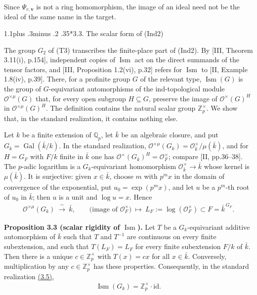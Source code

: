 \documentclass[11pt,a4paper]{amsart}
\makeatletter
\renewcommand\subsection{\@startsection{subsection}{2}{\z@}
{1.1\baselineskip plus .3\baselineskip minus .2\baselineskip}
{.35\baselineskip}{\normalfont\bfseries}}
\makeatother
\begin{document}
Since $\Psi_{r,\mathbf v}$ is not a ring homomorphism, the image of an ideal need not be the ideal of the same name in the target.


\Needspace{120pt}\subsection*{3.3. The scalar form of (Ind2)}

The group $G_2$ of (T3) transcribes the finite-place part of (Ind2). By [III, Theorem 3.11(i), p.154], independent copies of $\operatorname{Ism}$ act on the direct summands of the tensor factors, and [III, Proposition 1.2(vi), p.32] refers for $\operatorname{Ism}$ to [II, Example 1.8(iv), p.39]. There, for a profinite group $G$ of the relevant type, $\operatorname{Ism}(G)$ is the group of $G$-equivariant automorphisms of the ind-topological module $\mathcal O^{\times\mu}(G)$ that, for every open subgroup $H\subseteq G$, preserve the image of $\mathcal O^{\times}(G)^H$ in $\mathcal O^{\times\mu}(G)^H$. The definition contains the natural scalar group $\mathbb Z_p^\times$. We show that, in the standard realization, it contains nothing else.

Let $k$ be a finite extension of $\mathbb Q_p$, let $\bar k$ be an algebraic closure, and put $G_k=\operatorname{Gal}(\bar k/k)$. In the standard realization, $\mathcal O^{\times\mu}(G_k)=\mathcal O_{\bar k}^{\times}/\mu(\bar k)$, and for $H=G_F$ with $F/k$ finite in $\bar k$ one has $\mathcal O^\times(G_k)^H=\mathcal O_F^\times$; compare [II, pp.36--38]. The $p$-adic logarithm is a $G_k$-equivariant homomorphism $\mathcal O_{\bar k}^\times\to\bar k$ whose kernel is $\mu(\bar k)$. It is surjective: given $x\in\bar k$, choose $m$ with $p^mx$ in the domain of convergence of the exponential, put $u_0=\exp(p^mx)$, and let $u$ be a $p^m$-th root of $u_0$ in $\bar k$; then $u$ is a unit and $\log u=x$. Hence
\begin{equation}
\begin{gathered}
\mathcal O^{\times\mu}(G_k)\ \xrightarrow{\ \sim\ }\ \bar k,\qquad
\bigl(\text{image of }\mathcal O_F^\times\bigr)\ \longmapsto\ L_F:=\log(\mathcal O_F^\times)\subset F=\bar k^{\,G_F}.
\end{gathered}
\tag{3.5}\label{eq:3.5}
\end{equation}

\par\smallskip\noindent\textbf{Proposition 3.3 (scalar rigidity of $\operatorname{Ism}$).} Let $T$ be a $G_k$-equivariant additive automorphism of $\bar k$ such that $T$ and $T^{-1}$ are continuous on every finite subextension, and such that $T(L_F)=L_F$ for every finite subextension $F/k$ of $\bar k$. Then there is a unique $c\in\mathbb Z_p^\times$ with $T(x)=cx$ for all $x\in\bar k$. Conversely, multiplication by any $c\in\mathbb Z_p^\times$ has these properties. Consequently, in the standard realization \hyperref[eq:3.5]{(3.5)},
\begin{equation}
\begin{gathered}
\operatorname{Ism}(G_k)=\mathbb Z_p^\times\cdot\mathrm{id}.
\end{gathered}
\tag{3.6}\label{eq:3.6}
\end{equation}
\end{document}
